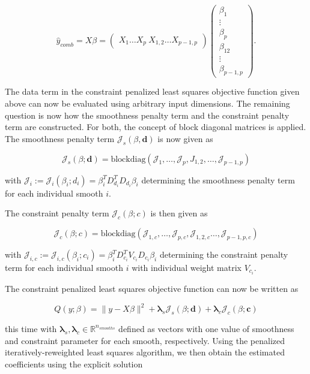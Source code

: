 \documentclass[10pt,a4paper]{article}
\begin{document}
	$$\hat y_{comb} = X \beta = \begin{pmatrix} X_1 \dots X_p \ X_{1,2} \dots X_{p-1,p}\end{pmatrix} \begin{pmatrix} \beta_1 \\ \vdots \\ \beta_p \\ \beta_{12} \\ \vdots \\ \beta_{p-1, p}  \end{pmatrix}.$$
	
	The data term in the constraint penalized least squares objective function given above can now be evaluated using arbitrary input dimensions. The remaining question is now how the smoothness penalty term and the constraint penalty term are constructed. For both, the concept of block diagonal matrices is applied. The smoothness penalty term $\mathcal J_s(\beta, \mathbf d)$ is now given as
	
	$$\mathcal J_s(\beta; \mathbf d) = \text{blockdiag}(\mathcal J_1, \dots, \mathcal J_p, J_{1,2}, \dots, \mathcal J_{p-1,p}) $$
	
	with $\mathcal J_i := \mathcal J_i(\beta_i; d_i) = \beta_i^T D_{d_i}^T D_{d_i} \beta_i$ determining the smoothness penalty term for each individual smooth $i$. 
	
	The constraint penalty term $\mathcal J_c(\beta; c)$ is then given as
	
	$$\mathcal J_c(\beta; c) = \text{blockdiag}(\mathcal J_{1,c}, \dots, \mathcal J_{p,c}, \mathcal J_{1,2,c} \dots, \mathcal J_{p-1,p,c})$$
	
	with $\mathcal J_{i,c} := \mathcal J_{i,c}(\beta_i; c_i) = \beta_i^T D_{c_i}^T V_{c_i} D_{c_i} \beta_i$ determining the constraint penalty term for each individual smooth $i$ with individual weight matrix $V_{c_i}$. 
	
	The constraint penalized least squares objective function can now be written as
	
	$$Q(y; \beta) = \lVert y - X\beta \rVert^2 + \boldsymbol \lambda_s \mathcal J_s(\beta; \boldsymbol d) + \boldsymbol \lambda_c \mathcal J_c(\beta; \boldsymbol c) $$
	
	this time with $\boldsymbol \lambda_s, \boldsymbol \lambda_c \in \mathbb{R}^{n_{smooths}}$  defined as vectors with one value of smoothness and constraint parameter for each smooth, respectively. Using the penalized iteratively-reweighted least squares algorithm, we then obtain the estimated coefficients using the explicit solution
	
\end{document}
